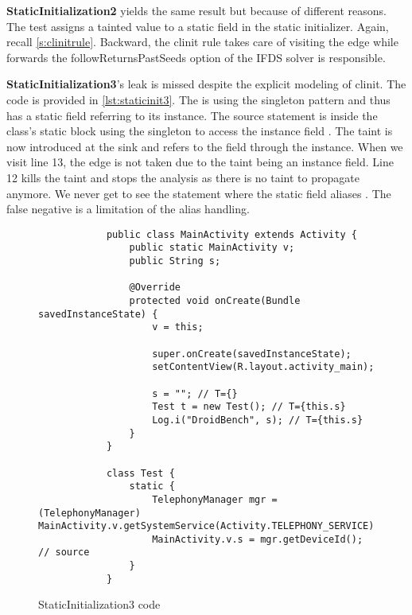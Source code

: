 \documentclass[../draft.tex]{subfiles}
\begin{document}
    \textbf{StaticInitialization2} yields the same result but because of different reasons. The test assigns a tainted value to a static field in the static initializer. Again, recall \autoref{s:clinitrule}. Backward, the clinit rule takes care of visiting the  edge while forwards the followReturnsPastSeeds option of the IFDS solver is responsible. 

    \textbf{StaticInitialization3}'s leak is missed despite the explicit modeling of clinit. The code is provided in \autoref{lst:staticinit3}. The  is using the singleton pattern and thus has a static field  referring to its instance. The source statement is inside the  class's static block using the singleton to access the instance field .
    The taint is now introduced at the sink and refers to the field through the  instance. When we visit line 13, the  edge is not taken due to the taint being an instance field. Line 12 kills the taint and stops the analysis as there is no taint to propagate anymore. We never get to see the statement where the static field  aliases . 
    The false negative is a limitation of the alias handling. 
    
    \begin{figure}[tbp]
        \begin{lstlisting}
            public class MainActivity extends Activity {
                public static MainActivity v;
                public String s;

                @Override
                protected void onCreate(Bundle savedInstanceState) {
                    v = this;
                
                    super.onCreate(savedInstanceState);
                    setContentView(R.layout.activity_main);
                
                    s = ""; // T={}
                    Test t = new Test(); // T={this.s}
                    Log.i("DroidBench", s); // T={this.s}
                }
            }

            class Test {
                static {
                    TelephonyManager mgr = (TelephonyManager) MainActivity.v.getSystemService(Activity.TELEPHONY_SERVICE);
                    MainActivity.v.s = mgr.getDeviceId(); // source
                }    
            }
        \end{lstlisting}
        \caption{StaticInitialization3 code}
        \label{lst:staticinit3}
    \end{figure}
\end{document}
